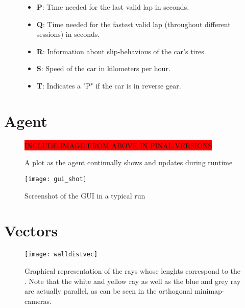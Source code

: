 \begin{figure}[h!t]
\begin{itemize}
		\item \textbf{P}: Time needed for the last valid lap in seconds.
		\item \textbf{Q}: Time needed for the fastest valid lap (throughout different sessions) in seconds.
		\item \textbf{R}: Information about slip-behavious of the car's tires.
		\item \textbf{S}: Speed of the car in kilometers per hour.
		\item \textbf{T}: Indicates a "P" if the car is in reverse gear.
	\end{itemize}
\end{figure}

\clearpage
\section{Agent}


\begin{figure}[h]
	\colorbox{red}{INCLUDE IMAGE FROM ABOVE IN FINAL VERSIONS}
	\centering
	\caption{A plot as the agent continually shows and updates during runtime}
	\label{fig:plot}
\end{figure}

\begin{figure}[h]
	\texttt{[image: gui\_shot]}
	\centering
	\caption{Screenshot of the GUI in a typical run}
	\label{fig:gui}
\end{figure}



\clearpage
\section{Vectors}

\begin{figure}[h]
	\texttt{[image: walldistvec]}
	\centering
	\caption[Graphical representation of the rays whose lenghts correspond to the ]{Graphical representation of the rays whose lenghts correspond to the . Note that the white and yellow ray as well as the blue and grey ray are actually parallel, as can be seen in the orthogonal minimap-cameras.}
	\label{fig:walldistvec}
\end{figure}